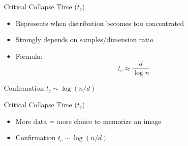 \documentclass[aspectratio=169]{beamer}
\begin{document}
\begin{frame}{Critical Collapse Time ($t_c$)}
    \begin{itemize}

        \item Represents when distribution becomes too concentrated
        \item Strongly depends on samples/dimension ratio
        \item Formula:
        \begin{equation}
            t_c \approx \frac{d}{\log n}
        \end{equation}
    \end{itemize}
    
    \begin{center}
     Confirmation $t_c \sim \log(n/d)$
    
    \end{center}
\end{frame}



\begin{frame}{Critical Collapse Time ($t_c$)}
\begin{itemize}
    \item More data = more choice to memorize an image
    \item Confirmation $t_c \sim \log(n/d)$
\end{itemize}
\begin{center}
    \end{center}
\end{frame}
\end{document}
